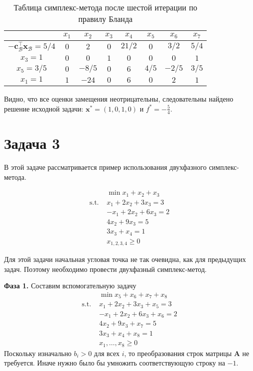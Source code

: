 \documentclass[12pt]{article}
\newcommand{\bx}{\mathbf{x}}
\newcommand{\bA}{\mathbf{A}}
\begin{document}
\begin{table}[!ht]
\centering
\caption{Таблица симплекс-метода после шестой итерации по правилу Бланда}
\begin{tabular}{|c|ccccccc|}
\hline
& $x_1$ & $x_2$ & $x_3$ & $x_4$ & $x_5$ & $x_6$ & $x_7$\\
\hline
$-\mathbf{c}_{\mathcal{B}}^{\top}\bx_{\mathcal{B}} = 5/4$ & $0$ & $2$ & $0$ & $21/2$ & $0$ & $3/2$ & $5/4$ \\
\hline
$x_3 = 1$ & $0$ & $0$ & $1$ & $0$ & $0$ & $0$ & $1$ \\
$x_5 = 3/5$ & $0$ & $-8/5$ & $0$ & $6$ & $4/5$ & $-2/5$ & $3/5$ \\
$x_1 = 1$ & $1$ & $-24$ & $0$ & $6$ & $0$ & $2$ & $1$ \\
\hline
\end{tabular}
\label{tab::simplex_26_2}
\end{table}

Видно, что все оценки замещения неотрицательны, следовательны найдено решение исходной задачи: $\bx^* = (1, 0, 1, 0)$ и $f^* = -\frac{5}{4}$.


\section{Задача 3}
В этой задаче рассматривается пример использования двухфазного симплекс-метода.

\begin{equation*}
\begin{split}
& \min x_1 + x_2 + x_3\\
\text{s.t. } & x_1 + 2x_2 + 3x_3 = 3\\
& -x_1 + 2x_2 + 6x_3 = 2\\
& 4x_2 + 9x_3 = 5\\
& 3x_3 + x_4 = 1\\
& x_{1,2,3,4} \geq 0
\end{split}
\end{equation*}

Для этой задачи начальная угловая точка не так очевидна, как для предыдущих задач. 
Поэтому необходимо провести двухфазный симплекс-метод.
 
\textbf{Фаза 1.} Составим вспомогательную задачу
\begin{equation*}
\begin{split}
& \min x_5 + x_6 + x_7 + x_8\\
\text{s.t. } & x_1 + 2x_2 + 3x_3 + x_5 = 3\\
& -x_1 + 2x_2 + 6x_3 + x_6 = 2\\
& 4x_2 + 9x_3 + x_7 = 5\\
& 3x_3 + x_4 + x_8 = 1\\
& x_1, \dots,x_8 \geq 0
\end{split}
\end{equation*}
Поскольку изначально $b_i > 0$ для всех $i$, то преобразования строк матрицы $\bA$ не требуется. 
Иначе нужно было бы умножить соответствующую строку на $-1$.
\end{document}
